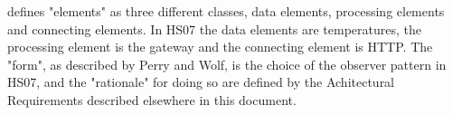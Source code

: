 \documentclass[a4paper,10pt]{article}
\begin{document}
\cite{perrywolf1992} defines "elements" as three different classes, data elements, processing elements and connecting elements. In HS07 the data elements are temperatures, the processing element is the gateway and the connecting element is HTTP. The "form", as described by Perry and Wolf, is the choice of the observer pattern in HS07, and the "rationale" for doing so are defined by the Achitectural Requirements described elsewhere in this document.



\end{document}
